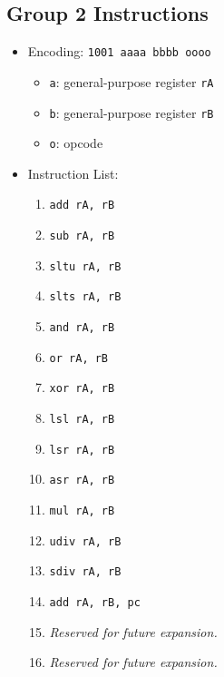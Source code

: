 \documentclass{article}
\begin{document}
	\subsection{Group 2 Instructions}
		\begin{itemize}
		\item Encoding:  \texttt{1001 aaaa bbbb oooo}
			\begin{itemize}
			\item \texttt{a}:  general-purpose register \texttt{rA}
			\item \texttt{b}:  general-purpose register \texttt{rB}
			\item \texttt{o}:  opcode
			\end{itemize}
		\item Instruction List:
			\begin{enumerate}
			\item \texttt{add rA, rB}
			\item \texttt{sub rA, rB}
			\item \texttt{sltu rA, rB}
			\item \texttt{slts rA, rB}

			\item \texttt{and rA, rB}
			\item \texttt{or rA, rB}
			\item \texttt{xor rA, rB}
			\item \texttt{lsl rA, rB}

			\item \texttt{lsr rA, rB}
			\item \texttt{asr rA, rB}
			\item \texttt{mul rA, rB}
			\item \texttt{udiv rA, rB}

			\item \texttt{sdiv rA, rB}
			\item \texttt{add rA, rB, pc}
			\item \textit{Reserved for future expansion.}
			\item \textit{Reserved for future expansion.}
			\end{enumerate}
		\end{itemize}
\end{document}
